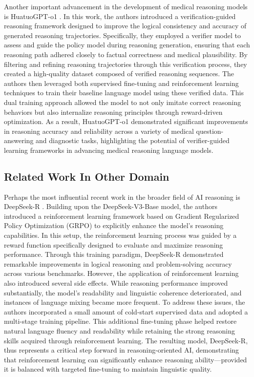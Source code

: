 \documentclass[conference]{IEEEtran}
\begin{document}
Another important advancement in the development of medical reasoning models is HuatuoGPT-o1
\cite{b14}. 
In this work, the authors introduced a verification-guided reasoning framework designed to improve the logical consistency and accuracy of generated reasoning trajectories. Specifically, they employed a verifier model to assess and guide the policy model during reasoning generation, ensuring that each reasoning path adhered closely to factual correctness and medical plausibility. By filtering and refining reasoning trajectories through this verification process, they created a high-quality dataset composed of verified reasoning sequences. The authors then leveraged both supervised fine-tuning and reinforcement learning techniques to train their baseline language model using these verified data. This dual training approach allowed the model to not only imitate correct reasoning behaviors but also internalize reasoning principles through reward-driven optimization. As a result, HuatuoGPT-o1 demonstrated significant improvements in reasoning accuracy and reliability across a variety of medical question-answering and diagnostic tasks, highlighting the potential of verifier-guided learning frameworks in advancing medical reasoning language models.


         \subsection{Related Work In Other Domain}
Perhaps the most influential recent work in the broader field of AI reasoning is DeepSeek-R
\cite{b15}. Building upon the DeepSeek-V3-Base model, the authors introduced a reinforcement learning framework based on Gradient Regularized Policy Optimization (GRPO)
\cite{b16} 
to explicitly enhance the model’s reasoning capabilities. In this setup, the reinforcement learning process was guided by a reward function specifically designed to evaluate and maximize reasoning performance. Through this training paradigm, DeepSeek-R demonstrated remarkable improvements in logical reasoning and problem-solving accuracy across various benchmarks.  
However, the application of reinforcement learning also introduced several side effects. While reasoning performance improved substantially, the model’s readability and linguistic coherence deteriorated, and instances of language mixing became more frequent. To address these issues, the authors incorporated a small amount of cold-start supervised data and adopted a multi-stage training pipeline. This additional fine-tuning phase helped restore natural language fluency and readability while retaining the strong reasoning skills acquired through reinforcement learning. The resulting model, DeepSeek-R, thus represents a critical step forward in reasoning-oriented AI, demonstrating that reinforcement learning can significantly enhance reasoning ability—provided it is balanced with targeted fine-tuning to maintain linguistic quality.
\end{document}
